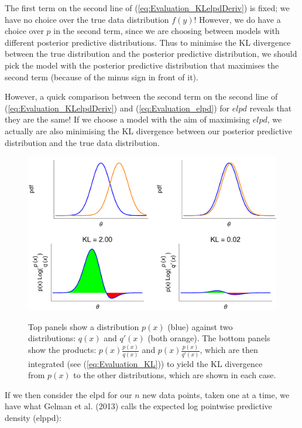\documentclass[11pt,fullpage]{book}
\begin{document}
The first term on the second line of (\ref{eq:Evaluation_KLelpdDeriv}) is fixed; we have no choice over the true data distribution $f(y)$! However, we do have a choice over $p$ in the second term, since we are choosing between models with different posterior predictive distributions. Thus to minimise the KL divergence between the true distribution and the posterior predictive distribution, we should pick the model with the posterior predictive distribution that maximises the second term (because of the minus sign in front of it). 

However, a quick comparison between the second term on the second line of (\ref{eq:Evaluation_KLelpdDeriv}) and (\ref{eq:Evaluation_elpd}) for $elpd$ reveals that they are the same! If we choose a model with the aim of maximising $elpd$, we actually are also minimising the KL divergence between our posterior predictive distribution and the true data distribution.

\begin{figure}
\centering
\scalebox{0.5} 
{\includegraphics{Evaluation_KLDivergence.pdf}}
\caption{Top panels show a distribution $p(x)$ (blue) against two distributions: $q(x)$ and $q'(x)$ (both orange). The bottom panels show the products: $p(x)\frac{p(x)}{q(x)}$ and $p(x)\frac{p(x)}{q'(x)}$, which are then integrated (see (\ref{eq:Evaluation_KL})) to yield the KL divergence from $p(x)$ to the other distributions, which are shown in each case.}\label{fig:Evaluation_KLDivergence}
\end{figure}

If we then consider the elpd for our $n$ new data points, taken one at a time, we have what Gelman  et al. (2013) calls the expected log pointwise predictive density (elppd):
\end{document}
